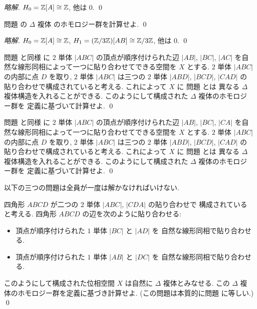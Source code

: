 \documentclass[12pt,twoside]{jarticle}
\newcommand\commentout[1]{#1}
\newcommand\commentout[1]{}
\begin{document}
\commentout{
\begin{proof}[略解]
 $H_0={\mathbb Z}[A]\cong{\mathbb Z}$, 他は $0$.
 \qed
\end{proof}
}

\begin{question}
\label{q:hatcher-non-Delta-complex-example-homology}
 問題  の $\Delta$ 複体
 のホモロジー群を計算せよ.
 \qed
\end{question}

\commentout{
\begin{proof}[略解]
 $H_0={\mathbb Z}[A]\cong{\mathbb Z}$, $H_1=({\mathbb Z}/3{\mathbb Z})[AB]\cong{\mathbb Z}/3{\mathbb Z}$, 他は $0$.
 \qed
\end{proof}
}

\begin{question}
 問題  と同様
 に $2$ 単体 $|ABC|$ の頂点が順序付けられた辺 $|AB|$, $|BC|$, $|AC|$ 
 を自然な線形同相によって一つに貼り合わせてできる空間を $X$ とする.
 $2$ 単体 $|ABC|$ の内部に点 $D$ を取り, 
 $2$ 単体 $|ABC|$ は三つの $2$ 単体 $|ABD|$, $|BCD|$, $|CAD|$ の
 貼り合わせで構成されていると考える.
 これによって $X$ に 
 問題  とは
 異なる $\Delta$ 複体構造を入れることができる.
 このようにして構成された $\Delta$ 複体のホモロジー群を
 定義に基づいて計算せよ.
 \qed
\end{question}

\begin{question}
 問題  と同様
 に $2$ 単体 $|ABC|$ の頂点が順序付けられた辺 $|AB|$, $|BC|$, $|CA|$ 
 を自然な線形同相によって一つに貼り合わせてできる空間を $X$ とする.
 $2$ 単体 $|ABC|$ の内部に点 $D$ を取り, 
 $2$ 単体 $|ABC|$ は三つの $2$ 単体 $|ABD|$, $|BCD|$, $|CAD|$ の
 貼り合わせで構成されていると考える.
 これによって $X$ に 
 問題  とは
 異なる $\Delta$ 複体構造を入れることができる.
 このようにして構成された $\Delta$ 複体のホモロジー群を
 定義に基づいて計算せよ.
 \qed
\end{question}

以下の三つの問題は全員が一度は解かなければいけない.

\begin{question}[2次元トーラス]
 四角形 $ABCD$ が二つの $2$ 単体 $|ABC|$, $|CDA|$ の貼り合わせで
 構成されていると考える.
 四角形 $ABCD$ の辺を次のように貼り合わせる:
 \begin{itemize}
  \item 頂点が順序付けられた $1$ 単体 $|BC|$ と $|AD|$ を
    自然な線形同相で貼り合わせる.
  \item 頂点が順序付けられた $1$ 単体 $|AB|$ と $|DC|$ を
    自然な線形同相で貼り合わせる.
 \end{itemize}
 このようにして構成された位相空間 $X$ は自然に $\Delta$ 複体とみなせる.
 この $\Delta$ 複体のホモロジー群を定義に基づき計算せよ.
 (この問題は本質的に問題  に等しい.)
 \qed
\end{question}
\end{document}
